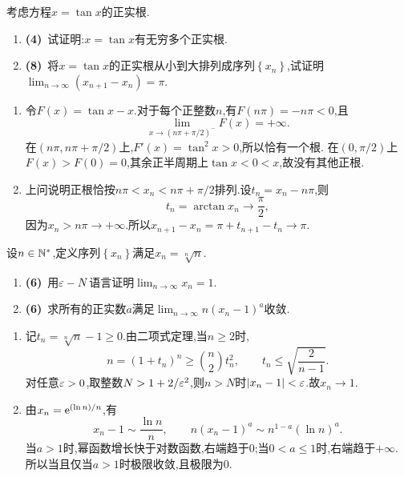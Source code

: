 \documentclass{ctexart}
\begin{document}
\begin{problem}[7.(12\songti{分})]
    考虑方程$x=\tan x$的正实根.
    \begin{enumerate}[label=\textbf{(\arabic*)}]
        \item \textbf{(4)}\ 试证明:$x=\tan x$有无穷多个正实根.
        \item \textbf{(8)}\ 将$x=\tan x$的正实根从小到大排列成序列$\left\{x_n\right\}$,试证明$\displaystyle\lim_{n\to\infty}\left(x_{n+1}-x_n\right)=\pi$.
    \end{enumerate}
\end{problem}
\begin{solution}
\begin{enumerate}[label=\textbf{(\arabic*)}]
        \item 令$F(x)=\tan x-x$.对于每个正整数$n$,有$F(n\pi)=-n\pi<0$,且
            \[\lim_{x\to(n\pi+\pi/2)^-}F(x)=+\infty.\]
            在$(n\pi,n\pi+\pi/2)$上,$F'(x)=\tan^2x>0$,所以恰有一个根.
            在$(0,\pi/2)$上$F(x)>F(0)=0$,其余正半周期上$\tan x<0<x$,故没有其他正根.
        \item 上问说明正根恰按$n\pi<x_n<n\pi+\pi/2$排列.设$t_n=x_n-n\pi$,则
            \[t_n=\arctan x_n\to\dfrac\pi2,\]
            因为$x_n>n\pi\to+\infty$.所以$x_{n+1}-x_n=\pi+t_{n+1}-t_n\to\pi$.
    \end{enumerate}
\end{solution}
\begin{problem}[8.(12\songti{分})]
    设$n\in\mathbb{N}^*$,定义序列$\left\{x_n\right\}$满足$x_n=\sqrt[n]{n}$.
    \begin{enumerate}[label=\textbf{(\arabic*)}]
        \item \textbf{(6)}\ 用$\varepsilon-N$语言证明$\displaystyle\lim_{n\to\infty}x_n=1$.
        \item \textbf{(6)}\ 求所有的正实数$a$满足$\displaystyle\lim_{n\to\infty}n(x_n-1)^a$收敛.
    \end{enumerate}
\end{problem}
\begin{solution}
\begin{enumerate}[label=\textbf{(\arabic*)}]
        \item 记$t_n=\sqrt[n]n-1\geqslant0$.由二项式定理,当$n\geqslant2$时,
            \[n=(1+t_n)^n\geqslant\binom n2t_n^2,\qquad t_n\leqslant\sqrt{\dfrac2{n-1}}.\]
            对任意$\varepsilon>0$,取整数$N>1+2/\varepsilon^2$,则$n>N$时$|x_n-1|<\varepsilon$.故$x_n\to1$.
        \item 由$x_n=\mathrm{e}^{(\ln n)/n}$,有
            \[x_n-1\sim\dfrac{\ln n}{n},\qquad n(x_n-1)^a\sim n^{1-a}(\ln n)^a.\]
            当$a>1$时,幂函数增长快于对数函数,右端趋于$0$;当$0<a\leqslant1$时,右端趋于$+\infty$.
            所以当且仅当$a>1$时极限收敛,且极限为$0$.
    \end{enumerate}
\end{solution}
\end{document}
